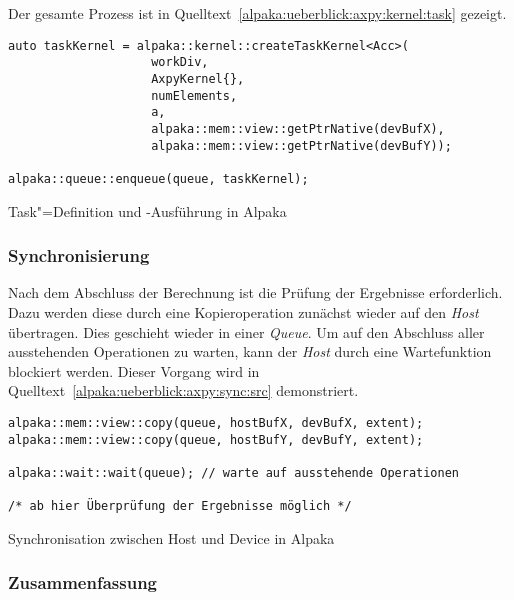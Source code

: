 Der gesamte Prozess ist in Quelltext~\ref{alpaka:ueberblick:axpy:kernel:task}
gezeigt.

\begin{code}
    \begin{verbatim}
auto taskKernel = alpaka::kernel::createTaskKernel<Acc>(
                    workDiv,
                    AxpyKernel{},
                    numElements,
                    a,
                    alpaka::mem::view::getPtrNative(devBufX),
                    alpaka::mem::view::getPtrNative(devBufY));

alpaka::queue::enqueue(queue, taskKernel);
    \end{verbatim}
    \caption{Task"=Definition und -Ausführung in Alpaka}
    \label{alpaka:ueberblick:axpy:kernel:task}
\end{code}

\subsubsection{Synchronisierung}
\label{alpaka:ueberblick:axpy:sync}

Nach dem Abschluss der Berechnung ist die Prüfung der Ergebnisse erforderlich.
Dazu werden diese durch eine Kopieroperation zunächst wieder auf den
\textit{Host} übertragen. Dies geschieht wieder in einer \textit{Queue}. Um
auf den Abschluss aller ausstehenden Operationen zu warten, kann der
\textit{Host} durch eine Wartefunktion blockiert werden. Dieser Vorgang wird in
Quelltext~\ref{alpaka:ueberblick:axpy:sync:src} demonstriert.

\begin{code}
    \begin{verbatim}
alpaka::mem::view::copy(queue, hostBufX, devBufX, extent);
alpaka::mem::view::copy(queue, hostBufY, devBufY, extent);

alpaka::wait::wait(queue); // warte auf ausstehende Operationen

/* ab hier Überprüfung der Ergebnisse möglich */
    \end{verbatim}
    \caption{Synchronisation zwischen Host und Device in Alpaka}
    \label{alpaka:ueberblick:axpy:sync:src}
\end{code}

\subsubsection{Zusammenfassung}
\label{alpaka:ueberblick:axpy:zusammenfassung}

